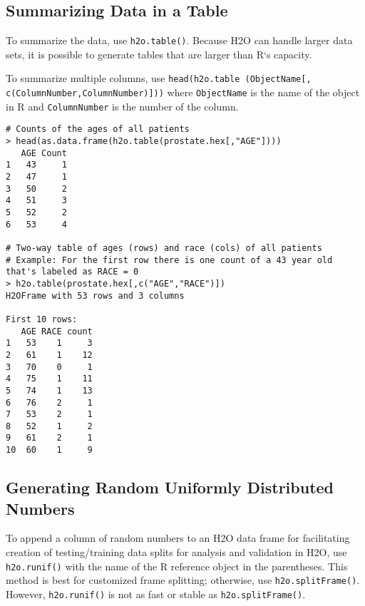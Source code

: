 \subsection{Summarizing Data in a Table}

To summarize the data, use {\texttt{h2o.table()}}. Because H2O can handle larger data sets, it is possible to generate tables that are larger than R`s capacity. 

To summarize multiple columns, use {\texttt{head(h2o.table (ObjectName[, c(ColumnNumber,ColumnNumber)]))}} where {\texttt{ObjectName}} is the name of the object in R and {\texttt{ColumnNumber}} is the number of the column. 

\begin{lstlisting}[style=R]
# Counts of the ages of all patients
> head(as.data.frame(h2o.table(prostate.hex[,"AGE"])))
   AGE Count
1   43     1
2   47     1
3   50     2
4   51     3
5   52     2
6   53     4

# Two-way table of ages (rows) and race (cols) of all patients
# Example: For the first row there is one count of a 43 year old that's labeled as RACE = 0
> h2o.table(prostate.hex[,c("AGE","RACE")])
H2OFrame with 53 rows and 3 columns

First 10 rows:
   AGE RACE count
1   53    1     3
2   61    1    12
3   70    0     1
4   75    1    11
5   74    1    13
6   76    2     1
7   53    2     1
8   52    1     2
9   61    2     1
10  60    1     9
\end{lstlisting}

\subsection{Generating Random Uniformly Distributed Numbers}

To append a column of random numbers to an H2O data frame for facilitating creation of testing/training data splits for analysis and validation in H2O, use {\texttt{h2o.runif()}} with the name of the R reference object in the parentheses. This method is best for customized frame splitting; otherwise, use {\texttt{h2o.splitFrame()}}. However, {\texttt{h2o.runif()}} is not as fast or stable as {\texttt{h2o.splitFrame()}}. 


